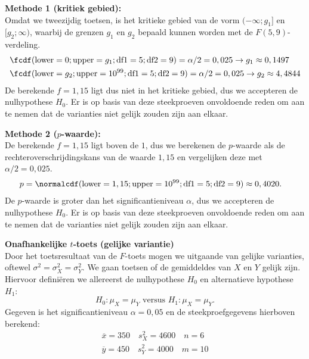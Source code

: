 {    {\bfseries Methode 1 (kritiek gebied):} \\
    Omdat we tweezijdig toetsen, is het kritieke gebied van de vorm $(-\infty; g_1]$ en $[g_2; \infty)$, waarbij de grenzen $g_1$ en $g_2$ bepaald kunnen worden met de $F(5,9)$-verdeling.
    \begin{align*}
        &\fcdf(\text{lower}=0; \text{upper}=g_1; \text{df1}=5; \text{df2}=9)=\alpha/2=0,025 \rightarrow g_1 \approx 0,1497\\
        &\fcdf(\text{lower}=g_2; \text{upper}=10^{99}; \text{df1}=5; \text{df2}=9)=\alpha/2=0,025 \rightarrow g_2 \approx 4,4844
    \end{align*}
    De berekende $f = 1,15$ ligt dus niet in het kritieke gebied, dus we accepteren de nulhypothese $H_0$.
    Er is op basis van deze steekproeven onvoldoende reden om aan te nemen dat de varianties niet gelijk zouden zijn aan elkaar.
    
    {\bfseries Methode 2 ($p$-waarde):} \\
    De berekende $f = 1,15$ ligt boven de $1$, dus we berekenen de $p$-waarde als de rechteroverschrijdingskans van de waarde $1,15$ en vergelijken deze met $\alpha/2 = 0,025$.
    \begin{align*}
        p &= \normalcdf(\text{lower}=1,15; \text{upper}=10^{99}; \text{df1}=5; \text{df2}=9) \approx 0,4020.
    \end{align*}
    De $p$-waarde is groter dan het significantieniveau $\alpha$, dus we accepteren de nulhypothese $H_0$.
    Er is op basis van deze steekproeven onvoldoende reden om aan te nemen dat de varianties niet gelijk zouden zijn aan elkaar.

    {\bfseries Onafhankelijke \boldmath$t$-toets (gelijke variantie)}\\
    Door het toetsresultaat van de $F$-toets mogen we uitgaande van gelijke varianties, oftewel $\sigma^2 = \sigma_X^2 = \sigma_Y^2$.
    We gaan toetsen of de gemiddeldes van $X$ en $Y$ gelijk zijn.
    Hiervoor defini\"eren we allereerst de nulhypothese $H_0$ en alternatieve hypothese $H_1$:
    \[
        H_0: \mu_X = \mu_Y \text{ versus } H_1: \mu_X = \mu_Y.
    \]
    Gegeven is het significantieniveau $\alpha = 0,05$ en de steekproefgegevens hierboven berekend:
    \begin{align*}
        \overline{x} = 350 \quad s_X^2 = 4600 \quad n = 6 \\
        \overline{y} = 450 \quad s_Y^2 = 4000 \quad m = 10 \\
    \end{align*}

}
